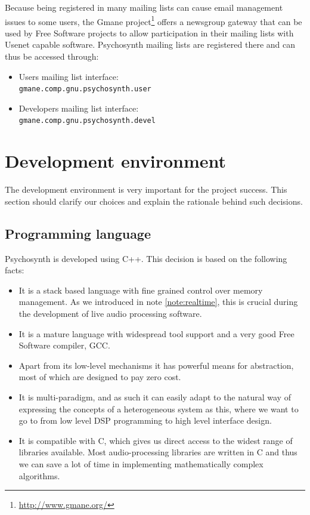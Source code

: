 Because being registered in many mailing lists can cause email
management issues to some users, the Gmane
project\footnote{\url{http://www.gmane.org/}} offers a
newsgroup gateway that can be used by Free Software
projects to allow participation in their mailing lists with Usenet
capable software. Psychosynth mailing lists are registered there and
can thus be accessed through:
\begin{itemize}
\item Users mailing list  interface:\\
  \verb|gmane.comp.gnu.psychosynth.user|
\item Developers mailing list  interface:\\
  \verb|gmane.comp.gnu.psychosynth.devel|
\end{itemize}

\section{Development environment}

The development environment is very important for the project
success. This section should clarify our choices and explain the
rationale behind such decisions.

\subsection{Programming language}

Psychosynth is developed using C++. This decision is based
on the following facts:
\begin{itemize}
\item It is a stack based language with fine grained control over
  memory management. As we introduced in note \ref{note:realtime},
  this is crucial during the development of live audio processing
  software.

\item It is a mature language with widespread tool support and a very
  good Free Software compiler, GCC.

\item Apart from its low-level mechanisms it has powerful means for
  abstraction, most of which are designed to pay zero cost.

\item It is multi-paradigm, and as
  such it can easily adapt to the natural way of expressing the
  concepts of a heterogeneous system as this, where we want to go to
  from low level DSP programming to high level interface design.

\item It is compatible with C, which gives us direct access to the
  widest range of libraries available. Most audio-processing libraries
  are written in C and thus we can save a lot of time in
  implementing mathematically complex algorithms. 
\end{itemize}

